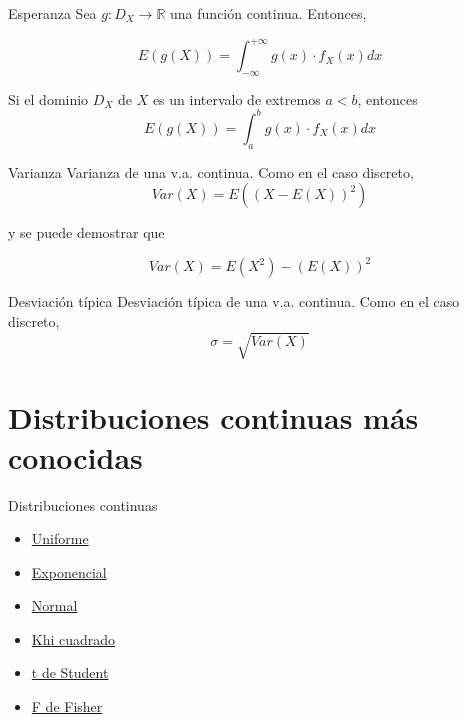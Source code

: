 \documentclass[
  ignorenonframetext,
]{beamer}
\providecommand{\tightlist}{%
  \setlength{\itemsep}{0pt}\setlength{\parskip}{0pt}}
\begin{document}
\begin{frame}{Esperanza}
\protect\hypertarget{esperanza-2}{}
Sea \(g:D_X\longrightarrow \mathbb{R}\) una función continua. Entonces,

\[E(g(X)) = \int_{-\infty}^{+\infty}g(x)\cdot f_X(x)dx\]

Si el dominio \(D_X\) de \(X\) es un intervalo de extremos \(a<b\),
entonces \[E(g(X))=\int_a^b g(x)\cdot f_X(x)dx\]
\end{frame}

\begin{frame}{Varianza}
\protect\hypertarget{varianza-2}{}
Varianza de una v.a. continua. Como en el caso discreto,
\[Var(X)=E((X-E(X))^2)\]

y se puede demostrar que

\[Var(X)=E(X^2)-(E(X))^2\]
\end{frame}

\begin{frame}{Desviación típica}
\protect\hypertarget{desviaciuxf3n-tuxedpica-1}{}
Desviación típica de una v.a. continua. Como en el caso discreto,
\[\sigma = \sqrt{Var(X)}\]
\end{frame}

\hypertarget{distribuciones-continuas-muxe1s-conocidas}{%
\section{Distribuciones continuas más
conocidas}\label{distribuciones-continuas-muxe1s-conocidas}}

\begin{frame}{Distribuciones continuas}
\protect\hypertarget{distribuciones-continuas}{}
\begin{itemize}
\tightlist
\item
  \href{https://es.wikipedia.org/wiki/Distribución_uniforme_continua}{Uniforme}
\item
  \href{https://es.wikipedia.org/wiki/Distribución_exponencial}{Exponencial}
\item
  \href{https://es.wikipedia.org/wiki/Distribución_normal}{Normal}
\item
  \href{https://es.wikipedia.org/wiki/Distribución_χ²}{Khi cuadrado}
\item
  \href{https://es.wikipedia.org/wiki/Distribución_t_de_Student}{t de
  Student}
\item
  \href{https://es.wikipedia.org/wiki/Distribución_F}{F de Fisher}
\end{itemize}
\end{frame}
\end{document}
